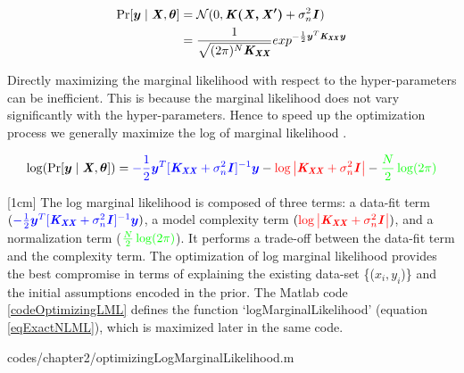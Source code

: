 \begin{equation}\label{equationMarginalLikelihood}
\begin{aligned}
\Pr[\boldsymbol{y} \mid \bm{\mathit{X}}, \boldsymbol{\theta}] & = \mathcal{N}(0 , \bm{\mathit{K(X, X')}} + \sigma^{2}_{n}\bm{\mathit{I}})  \\
& = \frac{1}{\sqrt{(2\pi)^{N} \bm{\mathit{K_{XX}}}}} exp^{-\frac{1}{2}\boldsymbol{y}^{T}\bm{\mathit{K_{XX}}}\boldsymbol{y}}
\end{aligned}
\end{equation}

Directly maximizing the marginal likelihood with respect to the hyper-parameters can be inefficient. This is because the marginal likelihood does not vary significantly with the hyper-parameters. Hence to speed up the optimization process we generally maximize the log of marginal likelihood \cite{Rasmussen2005}. 

  \begin{equation}\label{eqExactNLML}
\log(\Pr[\boldsymbol{y} \mid \bm{\mathit{X}}, \boldsymbol{\theta}]) = \textcolor{blue}{-\frac{1}{2}\boldsymbol{y}^{T}[\bm{\mathit{K_{XX}}} + \sigma^{2}_{n}\bm{\mathit{I}}]^{-1}\boldsymbol{y}} - \textcolor{red}{\log\left |  \bm{\mathit{K_{XX}}} + \sigma^{2}_{n}\bm{\mathit{I}} \right |} - \textcolor{green}{\frac{N}{2}\log(2\pi)}
  \end{equation}

[1cm]
The log marginal likelihood is composed of three terms: a data-fit term $( \textcolor{blue}{-\frac{1}{2}\boldsymbol{y}^{T}[\bm{\mathit{K_{XX}}} + \sigma^{2}_{n}\bm{\mathit{I}}]^{-1}\boldsymbol{y}})$, a model complexity term $( \textcolor{red}{\log\left |  \bm{\mathit{K_{XX}}} + \sigma^{2}_{n}\bm{\mathit{I}} \right |})$, and a normalization term ($\textcolor{green}{\frac{N}{2}\log(2\pi)}$). It performs a trade-off between the data-fit term and the complexity term. The optimization of log marginal likelihood provides the best compromise in terms of explaining the existing data-set \{($x_{i}, y_{i}$)\} and the initial assumptions encoded in the prior. The Matlab code \ref{codeOptimizingLML} defines the function `logMarginalLikelihood' (equation \ref{eqExactNLML}), which is maximized later in the same code.

\begin{mdframed}[hidealllines=true,backgroundcolor=lightgray!20]

                    {codes/chapter2/optimizingLogMarginalLikelihood.m}
\end{mdframed}

